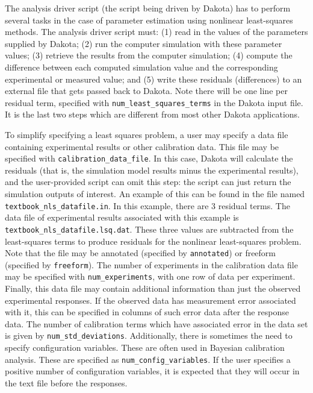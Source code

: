 The analysis driver script (the script being driven by Dakota) 
has to perform several tasks in the case of parameter estimation 
using nonlinear least-squares methods. The analysis driver script 
must: (1) read in the values of the parameters supplied by Dakota;
(2) run the computer simulation with these parameter values;
(3) retrieve the results from the computer simulation;
(4) compute the difference between each computed simulation value
and the corresponding experimental or measured value; and 
(5) write these residuals (differences)
to an external file that gets passed back to Dakota. Note there 
will be one line per residual term, specified with 
\texttt{num\_least\_squares\_terms}
in the Dakota input file. It is the last two steps which are different from 
most other Dakota applications. 

To simplify specifying a least squares problem, a user may specify a
data file containing experimental results or other calibration data.
This file may be specified with \texttt{calibration\_data\_file}. 
In this case, Dakota will calculate the residuals (that is, the
simulation model results minus the experimental results), and the
user-provided script can omit this step: the script can just return
the simulation outputs of interest. An example of this can be found
in the file named \texttt{textbook\_nls\_datafile.in}. 
In this example, there
are 3 residual terms. The data file of experimental results
associated with this example is \texttt{textbook\_nls\_datafile.lsq.dat}.
These three values are subtracted from the least-squares terms to
produce residuals for the nonlinear least-squares problem.
Note that the file may be annotated (specified by \texttt{annotated}) or 
freeform (specified by \texttt{freeform}). The number of experiments in the 
calibration data file may be specified with \texttt{num\_experiments}, 
with one row of data per experiment.
Finally, this data file may contain additional information than 
just the observed experimental responses. If the observed data 
has measurement error associated with it, this can be specified in 
columns of such error data after the response data. 
The number of calibration terms which have associated error in 
the data set is given by \texttt{num\_std\_deviations}. Additionally, 
there is sometimes the need to specify configuration variables. 
These are often used in Bayesian calibration analysis. These are 
specified as \texttt{num\_config\_variables}. If the user 
specifies a positive number of configuration variables, it is 
expected that they will occur in the text file before the responses. 

